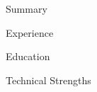 \documentclass{resume}
\begin{document}

\begin{rSection}{Summary}

\end{rSection}


\begin{rSection}{Experience}

\end{rSection}


\begin{rSection}{Education}

\end{rSection}


\begin{rSection}{Technical Strengths}

\end{rSection}
\end{document}
